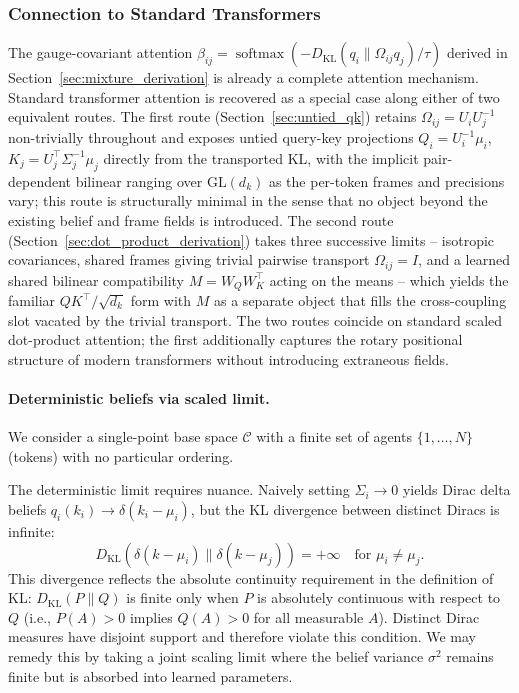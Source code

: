 \documentclass[11pt]{article}
\begin{document}
\subsubsection{Connection to Standard Transformers}

The gauge-covariant attention $\beta_{ij} = \operatorname{softmax}(-D_{\mathrm{KL}}(q_i \| \Omega_{ij} q_j)/\tau)$ derived in Section~\ref{sec:mixture_derivation} is already a complete attention mechanism. Standard transformer attention is recovered as a special case along either of two equivalent routes. The first route (Section~\ref{sec:untied_qk}) retains $\Omega_{ij} = U_iU_j^{-1}$ non-trivially throughout and exposes untied query-key projections $Q_i = U_i^{-1}\mu_i$, $K_j = U_j^\top\Sigma_j^{-1}\mu_j$ directly from the transported KL, with the implicit pair-dependent bilinear ranging over $\mathrm{GL}(d_k)$ as the per-token frames and precisions vary; this route is structurally minimal in the sense that no object beyond the existing belief and frame fields is introduced. The second route (Section~\ref{sec:dot_product_derivation}) takes three successive limits -- isotropic covariances, shared frames giving trivial pairwise transport $\Omega_{ij} = I$, and a learned shared bilinear compatibility $M = W_QW_K^\top$ acting on the means -- which yields the familiar $QK^\top / \sqrt{d_k}$ form with $M$ as a separate object that fills the cross-coupling slot vacated by the trivial transport. The two routes coincide on standard scaled dot-product attention; the first additionally captures the rotary positional structure of modern transformers without introducing extraneous fields.

\paragraph{Deterministic beliefs via scaled limit.}

We consider a single-point base space $\mathcal{C}$ with a finite set of agents $\{1,\dots,N\}$ (tokens) with no particular ordering.

The deterministic limit requires nuance. Naively setting $\Sigma_i \to 0$ yields Dirac delta beliefs $q_i(k_i) \to \delta(k_i - \mu_i)$, but the KL divergence between distinct Diracs is infinite:
\begin{equation}
D_{\mathrm{KL}}(\delta(k - \mu_i) \| \delta(k - \mu_j)) = +\infty \quad \text{for } \mu_i \neq \mu_j.
\label{eq:dirac_kl}
\end{equation}
This divergence reflects the absolute continuity requirement in the definition of KL: $D_{\mathrm{KL}}(P \| Q)$ is finite only when $P$ is absolutely continuous with respect to $Q$ (i.e., $P(A) > 0$ implies $Q(A) > 0$ for all measurable $A$). Distinct Dirac measures have disjoint support and therefore violate this condition. We may remedy this by taking a joint scaling limit where the belief variance $\sigma^2$ remains finite but is absorbed into learned parameters.
\end{document}
